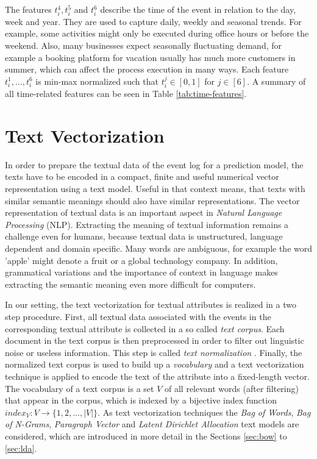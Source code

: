 The features $t_i^4, t_i^5$ and $t_i^6$ describe the time of the event in relation to the day, week and year.
They are used to capture daily, weekly and seasonal trends.
For example, some activities might only be executed during office hours or before the weekend.
Also, many businesses expect seasonally fluctuating demand, for example a booking platform for vacation usually has much more customers in summer, which can affect the process execution in many ways.
Each feature $t_i^1, \dots, t_i^6$ is min-max normalized such that $t_i^j \in [0,1]$ for $j \in [6]$.
A summary of all time-related features can be seen in Table \ref{tab:time-features}.

\section{Text Vectorization}\label{sec:text}

In order to prepare the textual data of the event log for a prediction model, the texts have to be encoded in a compact, finite and useful numerical vector representation using a text model.
Useful in that context means, that texts with similar semantic meanings should also have similar representations.
The vector representation of textual data is an important aspect in \textit{Natural Language Processing} (NLP).
Extracting the meaning of textual information remains a challenge even for humans, because textual data is unstructured, language dependent and domain specific.
Many words are ambiguous, for example the word 'apple' might denote a fruit or a global technology company.
In addition, grammatical variations and the importance of context in language makes extracting the semantic meaning even more difficult for computers.

In our setting, the text vectorization for textual attributes is realized in a two step procedure.
First, all textual data associated with the events in the corresponding textual attribute is collected in a so called \textit{text corpus}.
Each document in the text corpus is then preprocessed in order to filter out linguistic noise or useless information.
This step is called \textit{text normalization}  \cite{DBLP:books/lib/JurafskyM09}.
Finally, the normalized text corpus is used to build up a \textit{vocabulary} and a text vectorization technique is applied to encode the text of the attribute into a fixed-length vector.
The vocabulary of a text corpus is a set $V$ of all relevant words (after filtering) that appear in the corpus, which is indexed by a bijective index function $index_V \colon V \to \{1, 2, \dots, |V|\}$.
As text vectorization techniques the \textit{Bag of Words}, \textit{Bag of N-Grams}, \textit{Paragraph Vector} and \textit{Latent Dirichlet Allocation} text models are considered, which are introduced in more detail in the Sections \ref{sec:bow} to \ref{sec:lda}.

